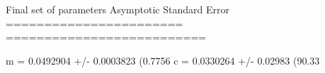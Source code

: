 Final set of parameters            Asymptotic Standard Error
=======================            ==========================

m               = 0.0492904        +/- 0.0003823    (0.7756%
c               = 0.0330264        +/- 0.02983      (90.33%
